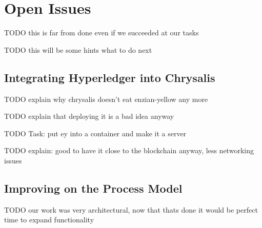 %
\chapter{Open Issues}
\label{sec:issues}

TODO this is far from done even if we succeeded at our tasks

TODO this will be some hints what to do next 

\section{Integrating Hyperledger into Chrysalis}
\label{sec:issues:integration}

TODO explain why chrysalis doesn't eat enzian-yellow any more

TODO explain that deploying it is a bad idea anyway

TODO Task: put ey into a container and make it a server

TODO explain: good to have it close to the blockchain anyway, less networking issues

\section{Improving on the Process Model}
\label{sec:issues:bpm}

TODO our work was very architectural, now that thats done it would be perfect time to expand functionality